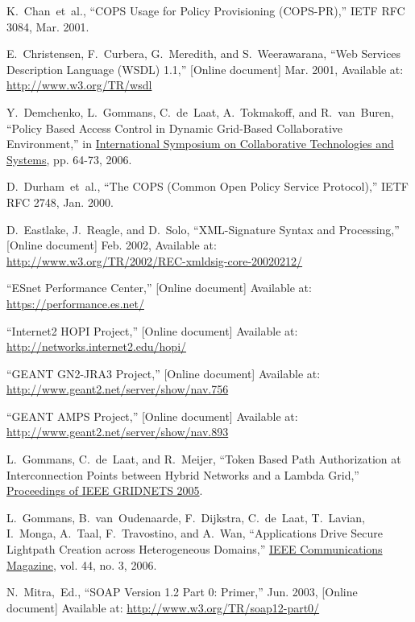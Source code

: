 \documentclass[conference]{IEEEtran}
\begin{document}
\begin{thebibliography}{1}
K.~Chan~et~al., ``COPS Usage for Policy Provisioning (COPS-PR),''
IETF RFC 3084, Mar. 2001.

E.~Christensen, F.~Curbera, G.~Meredith, and S.~Weerawarana,
``Web Services Description Language (WSDL) 1.1,'' [Online document] Mar. 2001,
Available at: \url{http://www.w3.org/TR/wsdl}

Y.~Demchenko, L.~Gommans, C.~de~Laat, A.~Tokmakoff, and R.~van~Buren,
``Policy Based Access Control in Dynamic Grid-Based Collaborative Environment,''
in
\underline{International Symposium on Collaborative Technologies and Systems},
pp. 64-73, 2006.

D.~Durham~et~al.,
``The COPS (Common Open Policy Service Protocol),'' IETF RFC 2748, Jan. 2000.

D.~Eastlake, J.~Reagle, and D.~Solo,
``XML-Signature Syntax and Processing,'' [Online document] Feb. 2002,
Available at: \\
\url{http://www.w3.org/TR/2002/REC-xmldsig-core-20020212/}

``ESnet Performance Center,'' [Online document] Available at: \\
\url{https://performance.es.net/}

``Internet2 HOPI Project,'' [Online document] Available at: \\
\url{http://networks.internet2.edu/hopi/}

``GEANT GN2-JRA3 Project,'' [Online document] Available at: \\
\url{http://www.geant2.net/server/show/nav.756}

``GEANT AMPS Project,'' [Online document] Available at: \\
\url{http://www.geant2.net/server/show/nav.893}

L.~Gommans, C.~de~Laat, and R.~Meijer,
``Token Based Path Authorization at Interconnection Points between Hybrid
Networks and a Lambda Grid,''
\underline{Proceedings of IEEE GRIDNETS 2005}.

L.~Gommans, B.~van~Oudenaarde, F.~Dijkstra, C.~de~Laat, T.~Lavian, I.~Monga,
A.~Taal, F.~Travostino, and A.~Wan,
``Applications Drive Secure Lightpath Creation across Heterogeneous Domains,''
\underline{IEEE Communications Magazine},
vol. 44, no. 3, 2006.

N.~Mitra,~Ed.,
``SOAP Version 1.2 Part 0: Primer,'' Jun. 2003, [Online document] Available at:
\url{http://www.w3.org/TR/soap12-part0/}


\end{thebibliography}
\end{document}
